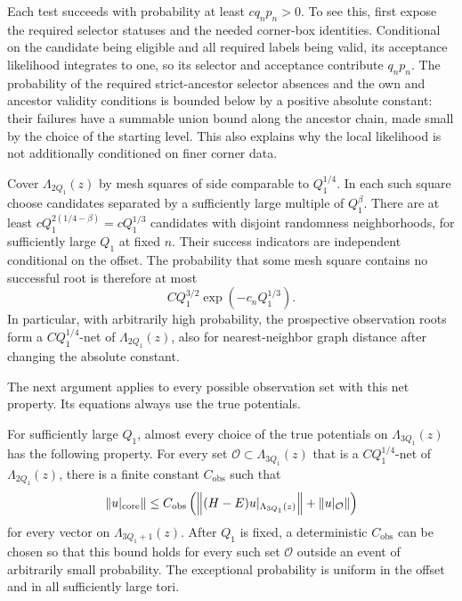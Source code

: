 Each test succeeds with probability at least $c q_n p_n>0$.
To see this, first expose the required selector statuses and the needed
corner-box identities. Conditional on the candidate being eligible and
all required labels being valid, its acceptance likelihood integrates
to one, so its selector and acceptance contribute $q_np_n$.
The probability of the required strict-ancestor selector absences and
the own and ancestor validity conditions is bounded below by a positive
absolute constant: their failures have a summable union bound along the
ancestor chain, made small by the choice of the starting level.
This also explains why the local likelihood is not additionally
conditioned on finer corner data.

Cover $\Lambda_{2Q_1}(z)$ by mesh squares of side comparable to
$Q_1^{1/4}$. In each such square choose candidates separated by a
sufficiently large multiple of $Q_1^\beta$. There are at least
$c Q_1^{2(1/4-\beta)}=cQ_1^{1/3}$ candidates with disjoint randomness
neighborhoods, for sufficiently large $Q_1$ at fixed $n$.
Their success indicators are independent conditional on the offset.
The probability that some mesh square contains no successful root is
therefore at most
\begin{equation}
 C Q_1^{3/2}\exp(-c_n Q_1^{1/3}).
 \label{screen:net-failure}
\end{equation}
In particular, with arbitrarily high probability, the prospective
observation roots form a $C Q_1^{1/4}$-net of
$\Lambda_{2Q_1}(z)$, also for nearest-neighbor graph distance after
changing the absolute constant.

The next argument applies to every possible observation set with this
net property. Its equations always use the true potentials.

\begin{lemma}
\label{screen:observation}
For sufficiently large $Q_1$, almost every choice of the true
potentials on $\Lambda_{3Q_1}(z)$ has the following property.
For every set $\mathcal O\subset\Lambda_{3Q_1}(z)$ that is a
$C Q_1^{1/4}$-net of $\Lambda_{2Q_1}(z)$, there is a finite constant
$C_{\mathrm{obs}}$ such that
\begin{equation}
 \left\lVert u|_{\mathrm{core}}\right\rVert
 \leq C_{\mathrm{obs}}
 \left(\left\lVert(H-E)u|_{\Lambda_{3Q_1}(z)}\right\rVert
             +\left\lVert u|_{\mathcal O}\right\rVert\right)
 \label{screen:observation-bound}
\end{equation}
for every vector on $\Lambda_{3Q_1+1}(z)$.
After $Q_1$ is fixed, a deterministic $C_{\mathrm{obs}}$ can be chosen
so that this bound holds for every such set $\mathcal O$ outside an
event of arbitrarily small probability. The exceptional probability
is uniform in the offset and in all sufficiently large tori.
\end{lemma}

